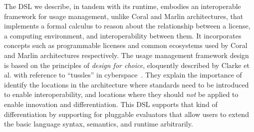The DSL we describe, in tandem with its runtime, embodies an interoperable framework for usage management, unlike Coral and Marlin architectures, that implements a formal calculus to reason about the relationship between a license, a computing environment, and interoperability between them. It incorporates concepts such as programmable licenses and common ecosystems used by Coral and Marlin architectures respectively. The usage management framework design is based on the principles of {\em design for choice}, eloquently described by Clarke et al. with reference to ``tussles'' in cyberspace~\cite{ClWrSoBr:02}. They explain the importance of identify the locations in the architecture where standards need to be introduced to enable interoperability, and locations where they should {\em not} be applied to enable innovation and differentiation.  This DSL supports that kind of differentiation by supporting for pluggable evaluators that allow users to extend the basic language syntax, semantics, and runtime arbitrarily.